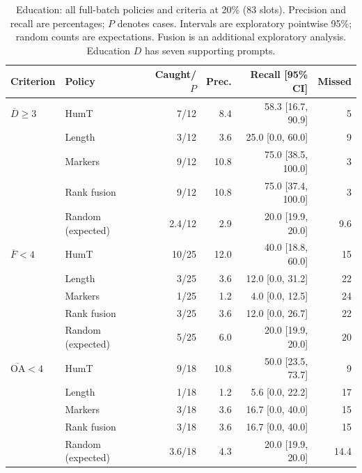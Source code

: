 \begin{table}[htbp]
\centering\small
\caption{Education: all full-batch policies and criteria at 20\% (83 slots). Precision and recall are percentages; $P$ denotes cases. Intervals are exploratory pointwise 95\%; random counts are expectations. Fusion is an additional exploratory analysis. Education $D$ has seven supporting prompts.}
\label{tab:full_education}
\begin{tabular}{llrrrr}
\toprule
Criterion & Policy & Caught/$P$ & Prec. & Recall [95\% CI] & Missed \\
\midrule
$\overline D\geq3$ & HumT & 7/12 & 8.4 & 58.3 [16.7, 90.9] & 5 \\
 & Length & 3/12 & 3.6 & 25.0 [0.0, 60.0] & 9 \\
 & Markers & 9/12 & 10.8 & 75.0 [38.5, 100.0] & 3 \\
 & Rank fusion & 9/12 & 10.8 & 75.0 [37.4, 100.0] & 3 \\
 & Random (expected) & 2.4/12 & 2.9 & 20.0 [19.9, 20.0] & 9.6 \\
$\overline F<4$ & HumT & 10/25 & 12.0 & 40.0 [18.8, 60.0] & 15 \\
 & Length & 3/25 & 3.6 & 12.0 [0.0, 31.2] & 22 \\
 & Markers & 1/25 & 1.2 & 4.0 [0.0, 12.5] & 24 \\
 & Rank fusion & 3/25 & 3.6 & 12.0 [0.0, 26.7] & 22 \\
 & Random (expected) & 5/25 & 6.0 & 20.0 [19.9, 20.0] & 20 \\
$\overline{\mathrm{OA}}<4$ & HumT & 9/18 & 10.8 & 50.0 [23.5, 73.7] & 9 \\
 & Length & 1/18 & 1.2 & 5.6 [0.0, 22.2] & 17 \\
 & Markers & 3/18 & 3.6 & 16.7 [0.0, 40.0] & 15 \\
 & Rank fusion & 3/18 & 3.6 & 16.7 [0.0, 40.0] & 15 \\
 & Random (expected) & 3.6/18 & 4.3 & 20.0 [19.9, 20.0] & 14.4 \\
\bottomrule
\end{tabular}
\end{table}

